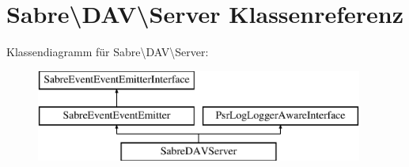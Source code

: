 \hypertarget{class_sabre_1_1_d_a_v_1_1_server}{}\section{Sabre\textbackslash{}D\+AV\textbackslash{}Server Klassenreferenz}
\label{class_sabre_1_1_d_a_v_1_1_server}
Klassendiagramm für Sabre\textbackslash{}D\+AV\textbackslash{}Server\+:\begin{figure}[H]
\begin{center}
\leavevmode
\includegraphics[height=3.000000cm]{class_sabre_1_1_d_a_v_1_1_server}
\end{center}
\end{figure}
